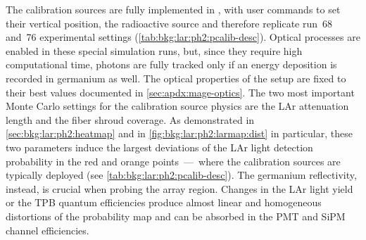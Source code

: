 The calibration sources are fully implemented in \mage, with user commands to set their
vertical position, the radioactive source and therefore replicate run~68 and~76
experimental settings (\cref{tab:bkg:lar:ph2:pcalib-desc}). Optical
processes are enabled in these special simulation runs, but, since they require high
computational time, photons are fully tracked only if an energy deposition is recorded in
germanium as well. The optical properties of the setup are fixed to their best values
documented in \cref{sec:apdx:mage-optics}. The two most important Monte Carlo settings
for the calibration source physics are the LAr attenuation length and the fiber shroud
coverage. As demonstrated in \cref{sec:bkg:lar:ph2:heatmap} and in
\cref{fig:bkg:lar:ph2:larmap:dist} in particular, these two parameters induce the largest
deviations of the LAr light detection probability in the red and orange points~---~where the
calibration sources are typically deployed (see \cref{tab:bkg:lar:ph2:pcalib-desc}). The
germanium reflectivity, instead, is crucial when probing the array region. Changes in the
LAr light yield or the TPB quantum efficiencies produce almost linear and homogeneous
distortions of the probability map and can be absorbed in the PMT and SiPM channel
efficiencies.

